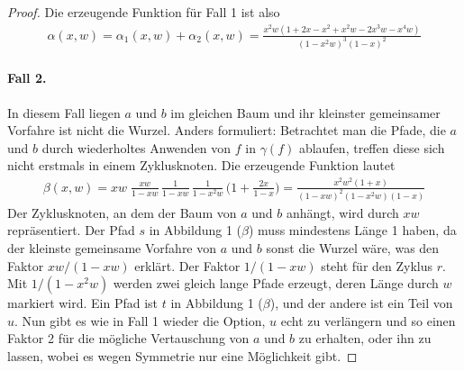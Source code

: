 \documentclass[a4paper, 10pt, ngerman]{article}
\begin{document}
\begin{proof}
    \noindent Die erzeugende Funktion für Fall 1 ist also
    \begin{align*}
        \alpha(x, w)
        = \alpha_1(x, w) + \alpha_2(x, w)
        = \frac {x^2w(1 + 2x - x^2 + x^2w - 2x^3w - x^4w)}
        {(1 - x^2w)^3(1 - x)^2}
    \end{align*}

    \paragraph{Fall 2.}  In diesem Fall liegen $a$ und $b$ im gleichen Baum und ihr kleinster gemeinsamer Vorfahre ist nicht die Wurzel. Anders formuliert: Betrachtet man die Pfade, die $a$ und $b$ durch wiederholtes Anwenden von $f$ in $\gamma(f)$ ablaufen, treffen diese sich nicht erstmals in einem Zyklusknoten. Die erzeugende Funktion lautet
    \begin{align*}
        \beta(x, w)
        = xw \; \frac {xw} {1 - xw} \, \frac {1} {1 - xw} \,
        \frac {1} {1 - x^2w} \, \Bigg (1 + \frac {2x} {1 - x} \Bigg )
        = \frac {x^2w^2(1 + x)} {(1 - xw)^2(1 - x^2w)(1 - x)}
    \end{align*}
    Der Zyklusknoten, an dem der Baum von $a$ und $b$ anhängt, wird durch $xw$ repräsentiert. Der Pfad $s$ in Abbildung 1 ($\beta$) muss mindestens Länge 1 haben, da der kleinste gemeinsame Vorfahre von $a$ und $b$ sonst die Wurzel wäre, was den Faktor $xw/(1 - xw)$ erklärt. Der Faktor $1/(1 - xw)$ steht für den Zyklus $r$. Mit $1/(1 - x^2w)$ werden zwei gleich lange Pfade erzeugt, deren Länge durch $w$ markiert wird. Ein Pfad ist $t$ in Abbildung 1 ($\beta$), und der andere ist ein Teil von $u$. Nun gibt es wie in Fall 1 wieder die Option, $u$ echt zu verlängern und so einen Faktor 2 für die mögliche Vertauschung von $a$ und $b$ zu erhalten, oder ihn zu lassen, wobei es wegen Symmetrie nur eine Möglichkeit gibt.



\end{proof}
\end{document}
